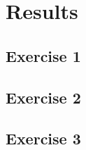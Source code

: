 \section{Results}\label{sec:results}

\subsection{Exercise 1}\label{subsec:exercise_1}

\subsection{Exercise 2}\label{subsec:exercise_2}

\subsection{Exercise 3}\label{subsec:exercise_3}